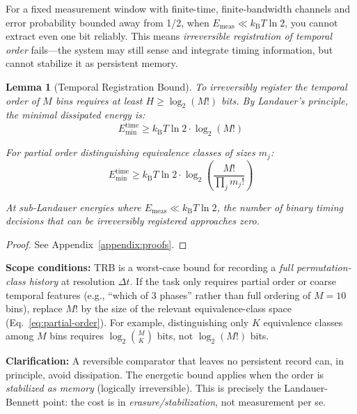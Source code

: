 \documentclass[12pt]{article}
\numberwithin{equation}{section}
\newtheorem{lemma}[theorem]{Lemma}
\newcommand{\kB}{k_{\mathrm{B}}}
\begin{document}
For a fixed measurement window with finite-time, finite-bandwidth channels and error probability bounded away from 1/2, when $E_{\text{meas}} \ll \kB T\ln 2$, you cannot extract even one bit reliably. This means \emph{irreversible registration of temporal order} fails---the system may still sense and integrate timing information, but cannot stabilize it as persistent memory.

\begin{lemma}[Temporal Registration Bound]
\label{lem:TRB}
To irreversibly register the temporal order of $M$ bins requires at least $H \ge \log_2(M!)$ bits. By Landauer's principle, the minimal dissipated energy is:
\begin{equation}
E_{\min}^{\mathrm{time}} \ge \kB T\ln 2 \cdot \log_2(M!)
\end{equation}

For partial order distinguishing equivalence classes of sizes $m_j$:
\begin{equation}
E_{\min}^{\mathrm{time}} \ge \kB T\ln 2 \cdot \log_2\!\left(\frac{M!}{\prod_j m_j!}\right) \label{eq:partial-order}
\end{equation}

At sub-Landauer energies where $E_{\text{meas}} \ll \kB T\ln 2$, the number of binary timing decisions that can be irreversibly registered approaches zero.
\end{lemma}

\begin{proof}
See Appendix~\ref{appendix:proofs}.
\end{proof}

\textbf{Scope conditions:} TRB is a worst-case bound for recording a \emph{full permutation-class history} at resolution $\Delta t$. If the task only requires partial order or coarse temporal features (e.g., ``which of 3 phases'' rather than full ordering of $M=10$ bins), replace $M!$ by the size of the relevant equivalence-class space (Eq.~\ref{eq:partial-order}). For example, distinguishing only $K$ equivalence classes among $M$ bins requires $\log_2\binom{M}{K}$ bits, not $\log_2(M!)$ bits.

\textbf{Clarification:} A reversible comparator that leaves no persistent record can, in principle, avoid dissipation. The energetic bound applies when the order is \emph{stabilized as memory} (logically irreversible). This is precisely the Landauer-Bennett point: the cost is in \emph{erasure/stabilization}, not measurement per se.
\end{document}
